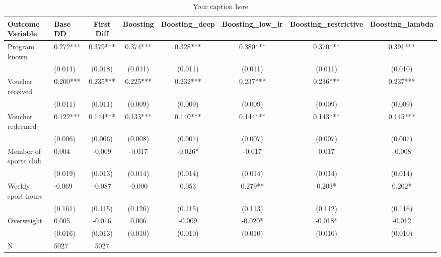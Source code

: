 \begin{sidewaystable*}
\centering
\begin{tabular}{llcccccc}
\hline
Outcome Variable & Base DD & First Diff & Boosting & Boosting_deep & Boosting_low_lr & Boosting_restrictive & Boosting_lambda \\
\hline
Program known & 0.272*** & 0.379*** & 0.374*** & 0.328*** & 0.380*** & 0.370*** & 0.391*** \\
  & (0.014) & (0.018) & (0.011) & (0.011) & (0.011) & (0.011) & (0.010) \\
Voucher received & 0.200*** & 0.235*** & 0.225*** & 0.232*** & 0.237*** & 0.236*** & 0.237*** \\
  & (0.011) & (0.011) & (0.009) & (0.009) & (0.009) & (0.009) & (0.009) \\
Voucher redeemed & 0.122*** & 0.144*** & 0.133*** & 0.140*** & 0.144*** & 0.143*** & 0.145*** \\
  & (0.006) & (0.006) & (0.008) & (0.007) & (0.007) & (0.007) & (0.007) \\
Member of sports club & 0.004 & -0.009 & -0.017 & -0.026* & -0.017 & 0.017 & -0.008 \\
  & (0.019) & (0.013) & (0.014) & (0.014) & (0.014) & (0.014) & (0.014) \\
Weekly sport hours & -0.069 & -0.087 & -0.000 & 0.053 & 0.279** & 0.203* & 0.202* \\
  & (0.161) & (0.115) & (0.126) & (0.115) & (0.113) & (0.112) & (0.116) \\
Overweight & 0.005 & -0.016 & 0.006 & -0.009 & -0.020* & -0.018* & -0.012 \\
  & (0.016) & (0.013) & (0.010) & (0.010) & (0.010) & (0.010) & (0.010) \\
\hline
N & 5027 & 5027  &  &  &  &  \\
\hline
\end{tabular}
\caption{Your caption here}
\label{tab:your_label}
\end{sidewaystable*}